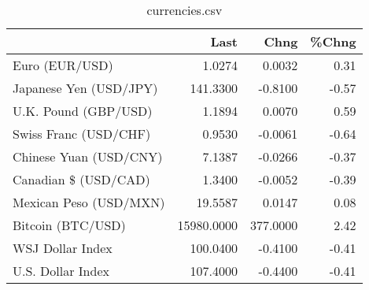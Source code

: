 \documentclass{article}%
\begin{document}
%


\begin{table}[htbp]%
\caption{currencies.csv}%
\centering%
\begin{adjustbox}{width=1\textwidth}%
\begin{tabular}{lrrr}
\toprule
                       &       Last &     Chng &  \%Chng \\
\midrule
        Euro (EUR/USD) &     1.0274 &   0.0032 &   0.31 \\
Japanese Yen (USD/JPY) &   141.3300 &  -0.8100 &  -0.57 \\
  U.K. Pound (GBP/USD) &     1.1894 &   0.0070 &   0.59 \\
 Swiss Franc (USD/CHF) &     0.9530 &  -0.0061 &  -0.64 \\
Chinese Yuan (USD/CNY) &     7.1387 &  -0.0266 &  -0.37 \\
  Canadian \$ (USD/CAD) &     1.3400 &  -0.0052 &  -0.39 \\
Mexican Peso (USD/MXN) &    19.5587 &   0.0147 &   0.08 \\
     Bitcoin (BTC/USD) & 15980.0000 & 377.0000 &   2.42 \\
      WSJ Dollar Index &   100.0400 &  -0.4100 &  -0.41 \\
     U.S. Dollar Index &   107.4000 &  -0.4400 &  -0.41 \\
\bottomrule
\end{tabular}
%
\end{adjustbox}%
\end{table}

%
\end{document}
